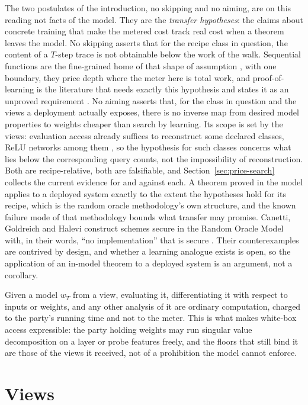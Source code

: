 \documentclass[11pt]{article}
\theoremstyle{definition}
\theoremstyle{plain}
\theoremstyle{remark}
\begin{document}
The two postulates of the introduction, no skipping and no aiming, are on this
reading not facts of the model. They are the \emph{transfer hypotheses}: the
claims about concrete training that make the metered cost track real cost when a
theorem leaves the model. No skipping asserts that for the recipe class in
question, the content of a $T$-step trace is not obtainable below the work of
the walk. Sequential functions are the fine-grained home of that shape of
assumption \cite{GM24}, with one boundary, they price depth where the meter here
is total work, and proof-of-learning is the literature that needs exactly this
hypothesis and states it as an unproved requirement \cite{JYCDTCP21}. No aiming
asserts that, for the class in question and the views a deployment actually
exposes, there is no inverse map from desired model properties to weights
cheaper than search by learning. Its scope is set by the views: evaluation
access already suffices to reconstruct some declared classes, ReLU networks
among them \cite{CJM20}, so the hypothesis for such classes concerns what lies
below the corresponding query counts, not the impossibility of reconstruction. Both are
recipe-relative, both are falsifiable, and Section~\ref{sec:price-search}
collects the current evidence for and against each. A theorem proved in the
model applies to a deployed system exactly to the extent the hypotheses hold for
its recipe, which is the random oracle methodology's own structure, and the
known failure mode of that methodology bounds what transfer may promise.
Canetti, Goldreich and Halevi construct schemes secure in the Random Oracle
Model with, in their words, ``no implementation'' that is secure \cite{CGH04}.
Their counterexamples are contrived by design, and whether a learning analogue
exists is open, so the application of an in-model theorem to a deployed system
is an argument, not a corollary.

Given a model $w_T$ from a view, evaluating it, differentiating it with respect
to inputs or weights, and any other analysis of it are ordinary computation,
charged to the party's running time and not to the meter. This is what makes
white-box access expressible: the party holding weights may run singular value
decomposition on a layer or probe features freely, and the floors that still
bind it are those of the views it received, not of a prohibition the model
cannot enforce.

\section{Views}
\label{sec:view}
\end{document}
